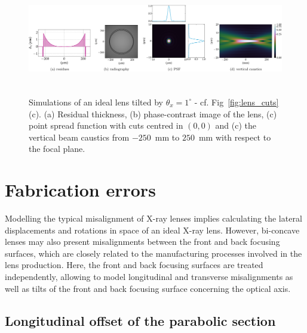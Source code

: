 \begin{refsection}
\begin{figure}[t]
        \centering
        {\includegraphics[height=4.19cm]{figures/ch04/tilted_CRL.pdf}}
        \caption[Effects of a CRL tilt]{Simulations of an ideal lens tilted by $\theta_x=1^{\circ}$ - cf. Fig~\ref{fig:lens_cuts}(c). (a) Residual thickness, (b) phase-contrast image of the lens, (c) point spread function with cuts centred in $(0,0)$ and (c) the vertical beam caustics from $-250$~mm to $250$~mm with respect to the focal plane. } \label{fig:tilted_CRL}
\end{figure}
\section{Fabrication errors}\label{sec:fabrication}

Modelling the typical misalignment of X-ray lenses implies calculating the lateral displacements and rotations in space of an ideal X-ray lens. However, bi-concave lenses may also present misalignments between the front and back focusing surfaces, which are closely related to the manufacturing processes involved in the lens production. Here, the front and back focusing surfaces are treated independently, allowing to model longitudinal and transverse misalignments as well as tilts of the front and back focusing surface concerning the optical axis.

\subsection{Longitudinal offset of the parabolic section}


\end{refsection}
